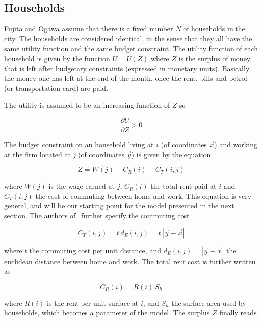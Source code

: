 \subsection{Households} 
\label{sub:households}

Fujita and Ogawa assume that there is a fixed number $N$ of households in the
city. The households are considered identical, in the sense that they all have
the same utility function and the same budget constraint. The utility function
of each household is given by the function $U = U(Z)$ where $Z$ is the surplus
of money that is left after budgetary constraints (expressed in monetary units).
Basically the money one has left at the end of the month, once the rent, bills
and petrol (or transportation card) are paid. 

The utility is assumed to be an increasing function of $Z$ so

\begin{equation}
    \frac{\partial U}{\partial Z} > 0
\end{equation}

The budget constraint on an household living at $i$ (of coordinates $\vec{x}$)
and working at the firm located at $j$ (of coordinates $\vec{y}$) is given by the
equation

\begin{equation}
    Z = W\left(j\right)
      - C_R\left(i\right)
      - C_T\left(i,j\right)
\end{equation} 

where $W\left(j\right)$ is the wage earned at $j$, $C_R\left(i\right)$ the total
rent paid at $i$ and $C_T\left(i,j\right)$ the cost of commuting between
home and work. This equation is very general, and will be our starting point for
the model presented in the next section. The authors of~\cite{Fujita:1982}
further specify the commuting cost

\begin{equation}
    C_T\left(i,j\right) = t\,d_E(i,j) = t\,\left|\vec{y}-\vec{x}\right|
\end{equation}

where $t$ the commuting cost per unit distance, and $d_E(i,j) = \left| \vec{y} -
\vec{x} \right|$ the euclidean distance between home and work. The total rent
cost is further written as

\begin{equation}
    C_R\left(i\right) = R(i)\,S_h
\end{equation}

where $R(i)$ is the rent per unit surface at $i$, and $S_h$ the surface area
used by households, which becomes a parameter of the model.
The surplus $Z$
finally reads


